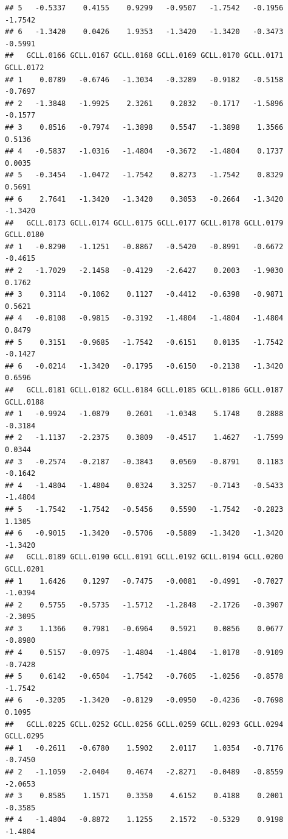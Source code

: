 \documentclass[
]{article}
\begin{document}
\begin{verbatim}
## 5   -0.5337    0.4155    0.9299   -0.9507   -1.7542   -0.1956   -1.7542
## 6   -1.3420    0.0426    1.9353   -1.3420   -1.3420   -0.3473   -0.5991
##   GCLL.0166 GCLL.0167 GCLL.0168 GCLL.0169 GCLL.0170 GCLL.0171 GCLL.0172
## 1    0.0789   -0.6746   -1.3034   -0.3289   -0.9182   -0.5158   -0.7697
## 2   -1.3848   -1.9925    2.3261    0.2832   -0.1717   -1.5896   -0.1577
## 3    0.8516   -0.7974   -1.3898    0.5547   -1.3898    1.3566    0.5136
## 4   -0.5837   -1.0316   -1.4804   -0.3672   -1.4804    0.1737    0.0035
## 5   -0.3454   -1.0472   -1.7542    0.8273   -1.7542    0.8329    0.5691
## 6    2.7641   -1.3420   -1.3420    0.3053   -0.2664   -1.3420   -1.3420
##   GCLL.0173 GCLL.0174 GCLL.0175 GCLL.0177 GCLL.0178 GCLL.0179 GCLL.0180
## 1   -0.8290   -1.1251   -0.8867   -0.5420   -0.8991   -0.6672   -0.4615
## 2   -1.7029   -2.1458   -0.4129   -2.6427    0.2003   -1.9030    0.1762
## 3    0.3114   -0.1062    0.1127   -0.4412   -0.6398   -0.9871    0.5621
## 4   -0.8108   -0.9815   -0.3192   -1.4804   -1.4804   -1.4804    0.8479
## 5    0.3151   -0.9685   -1.7542   -0.6151    0.0135   -1.7542   -0.1427
## 6   -0.0214   -1.3420   -0.1795   -0.6150   -0.2138   -1.3420    0.6596
##   GCLL.0181 GCLL.0182 GCLL.0184 GCLL.0185 GCLL.0186 GCLL.0187 GCLL.0188
## 1   -0.9924   -1.0879    0.2601   -1.0348    5.1748    0.2888   -0.3184
## 2   -1.1137   -2.2375    0.3809   -0.4517    1.4627   -1.7599    0.0344
## 3   -0.2574   -0.2187   -0.3843    0.0569   -0.8791    0.1183   -0.1642
## 4   -1.4804   -1.4804    0.0324    3.3257   -0.7143   -0.5433   -1.4804
## 5   -1.7542   -1.7542   -0.5456    0.5590   -1.7542   -0.2823    1.1305
## 6   -0.9015   -1.3420   -0.5706   -0.5889   -1.3420   -1.3420   -1.3420
##   GCLL.0189 GCLL.0190 GCLL.0191 GCLL.0192 GCLL.0194 GCLL.0200 GCLL.0201
## 1    1.6426    0.1297   -0.7475   -0.0081   -0.4991   -0.7027   -1.0394
## 2    0.5755   -0.5735   -1.5712   -1.2848   -2.1726   -0.3907   -2.3095
## 3    1.1366    0.7981   -0.6964    0.5921    0.0856    0.0677   -0.8980
## 4    0.5157   -0.0975   -1.4804   -1.4804   -1.0178   -0.9109   -0.7428
## 5    0.6142   -0.6504   -1.7542   -0.7605   -1.0256   -0.8578   -1.7542
## 6   -0.3205   -1.3420   -0.8129   -0.0950   -0.4236   -0.7698    0.1095
##   GCLL.0225 GCLL.0252 GCLL.0256 GCLL.0259 GCLL.0293 GCLL.0294 GCLL.0295
## 1   -0.2611   -0.6780    1.5902    2.0117    1.0354   -0.7176   -0.7450
## 2   -1.1059   -2.0404    0.4674   -2.8271   -0.0489   -0.8559   -2.0653
## 3    0.8585    1.1571    0.3350    4.6152    0.4188    0.2001   -0.3585
## 4   -1.4804   -0.8872    1.1255    2.1572   -0.5329    0.9198   -1.4804

\end{verbatim}
\end{document}
